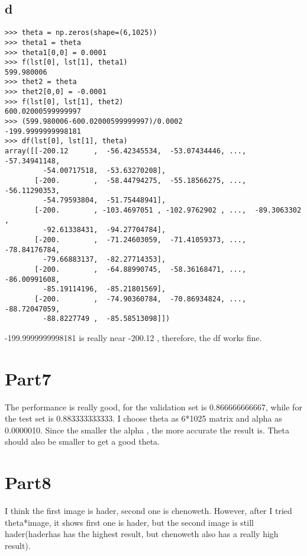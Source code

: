 \documentclass[12pt]{article}
\begin{document}
\subsection{d}
\begin{verbatim}
>>> theta = np.zeros(shape=(6,1025))
>>> theta1 = theta
>>> theta1[0,0] = 0.0001
>>> f(lst[0], lst[1], theta1)
599.980006
>>> thet2 = theta
>>> thet2[0,0] = -0.0001
>>> f(lst[0], lst[1], thet2)
600.02000599999997
>>> (599.980006-600.02000599999997)/0.0002
-199.9999999998181
>>> df(lst[0], lst[1], theta)
array([[-200.12      ,  -56.42345534,  -53.07434446, ...,  -57.34941148,
         -54.00717518,  -53.63270208],
       [-200.        ,  -58.44794275,  -55.18566275, ...,  -56.11290353,
         -54.79593804,  -51.75448941],
       [-200.        , -103.4697051 , -102.9762902 , ...,  -89.3063302 ,
         -92.61338431,  -94.27704784],
       [-200.        ,  -71.24603059,  -71.41059373, ...,  -78.84176784,
         -79.66883137,  -82.27714353],
       [-200.        ,  -64.88990745,  -58.36168471, ...,  -86.00991608,
         -85.19114196,  -85.21801569],
       [-200.        ,  -74.90360784,  -70.86934824, ...,  -88.72047059,
         -88.8227749 ,  -85.58513098]])
\end{verbatim}
-199.9999999998181  is really near -200.12 , therefore, the df works fine.  

\section{Part7}
The performance is really good, for the  validation set  is 0.866666666667, while for the test set is 0.883333333333. I choose theta as  6*1025 matrix and  alpha as  0.0000010. Since the smaller the alpha , the more accurate the result  is.  Theta should also be smaller  to get a good theta.

\section{Part8}
I think the first image is hader, second one is chenoweth. However, after I tried theta*image, it shows first one is hader, but the second image is still hader(haderhas has the highest result, but chenoweth also has a really high result). 
\end{document}
